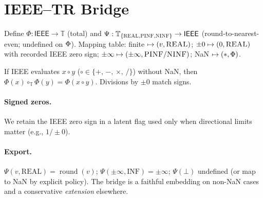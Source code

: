 \documentclass[twoside,11pt]{article}
\newcommand{\TR}{\mathbb{T}}
\newcommand{\trReal}{\textsc{REAL}}
\newcommand{\trPINF}{\textsc{PINF}}
\newcommand{\trNINF}{\textsc{NINF}}
\newcommand{\trPHI}{\textsc{$\Phi$}}
\newcommand{\TAGREAL}{\trReal}
\newcommand{\TAGPINF}{\trPINF}
\newcommand{\TAGNINF}{\trNINF}
\newcommand{\TAGPHI}{\trPHI}
\begin{document}
\section*{IEEE--TR Bridge}
\label{sec:ieee-tr-bridge}
Define $\Phi:\mathsf{IEEE}\to\TR$ (total) and $\Psi:\TR_{\{\TAGREAL,\TAGPINF,\TAGNINF\}}\to\mathsf{IEEE}$ (round-to-nearest-even; undefined on $\TAGPHI$). Mapping table: finite $\mapsto (v,\TAGREAL)$; $\pm0\mapsto (0,\TAGREAL)$ with recorded IEEE zero sign; $\pm\infty\mapsto (\pm\infty,\TAGPINF/\TAGNINF)$; NaN $\mapsto (\ast,\TAGPHI)$.
\begin{lemma}
If IEEE evaluates $x\circ y$ (\(\circ\in\{+,\,-,\,\times,\,/\}\)) without NaN, then $\Phi(x)\circ_{\TR}\Phi(y)=\Phi(x\circ y)$. Divisions by $\pm0$ match signs.
\end{lemma}
\paragraph{Signed zeros.} We retain the IEEE zero sign in a latent flag used only when directional limits matter (e.g., $1/\pm0$).
\paragraph{Export.} $\Psi(v,\mathrm{REAL})=\operatorname{round}(v)$; $\Psi(\pm\infty,\mathrm{INF})=\pm\infty$; $\Psi(\bot)$ undefined (or map to NaN by explicit policy). The bridge is a faithful embedding on non-NaN cases and a conservative \emph{extension} elsewhere.

\end{document}
